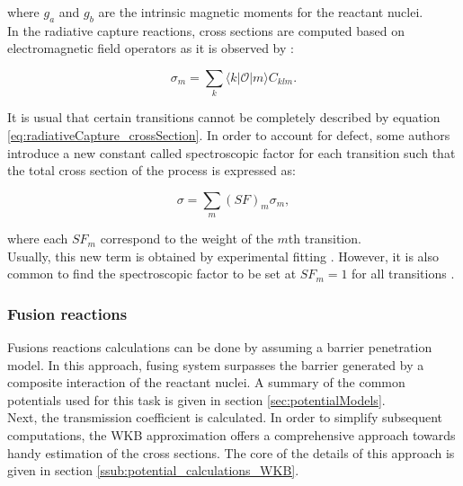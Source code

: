 \documentclass[openany]{book}
\begin{document}
where $g_a$ and $g_b$ are the intrinsic magnetic moments for the reactant nuclei. \\

In the radiative capture reactions, cross sections are computed based on electromagnetic field operators as it is observed by \cite{huang_bertulani_guimaraes_2010}: 

\begin{equation}  \label{eq:radiativeCapture_crossSection}
	\sigma_m = \sum_{k}{\langle k | \mathcal{O} | m \rangle} C_{klm}.		
\end{equation}

It is usual that certain transitions cannot be completely described by equation \ref{eq:radiativeCapture_crossSection}. In order to account for defect, some authors introduce a new constant called spectroscopic factor for each transition such that the total cross section of the process is expressed as: 

\begin{equation}  \label{eq:radiativeCapture_crossSection_SF}
	\sigma = \sum_{m}{{(SF)}_m\sigma_m},		
\end{equation}

where each ${SF}_m$ correspond to the weight of the $m$th transition. \\ 

Usually, this new term is obtained by experimental fitting \cite{kabir_nabi_2021, xu_takahashi_goriely_arnould_ohta_utsunomiya_2013}. However, it is also common to find the spectroscopic factor to be set at $SF_m = 1$ for all transitions \cite{bertulani_1996}.

\subsubsection{Fusion reactions} \label{ssub:potential_calculations_fusion}

Fusions reactions calculations can be done by assuming a barrier penetration model. In this approach, fusing system surpasses the barrier generated by a composite interaction of the reactant nuclei. A summary of the common potentials used for this task is given in section \ref{sec:potentialModels}. \\

Next, the transmission coefficient is calculated. In order to simplify subsequent computations, the WKB approximation offers a comprehensive approach towards handy estimation of the cross sections. The core of the details of this approach is given in section \ref{ssub:potential_calculations_WKB}.
\end{document}
